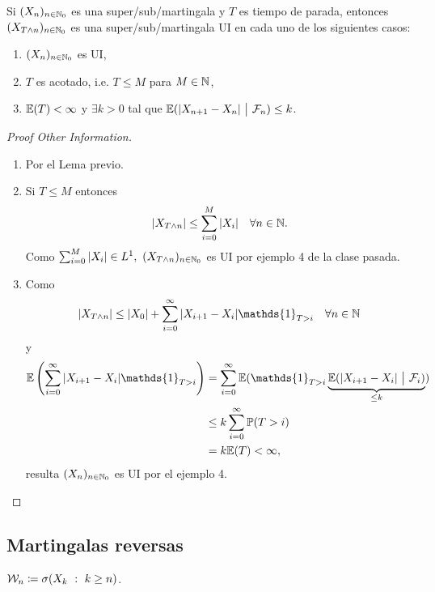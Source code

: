 \begin{theorem}
	Si $(X_{n})_{n \in \mathbb{N}_{0}}$ es una super/sub/martingala y $T$ es tiempo de parada, entonces $(X_{T \wedge n})_{n \in \mathbb{N}_{0}}$ es una super/sub/martingala UI en cada uno de los siguientes casos:
	\begin{enumerate}
		\item $(X_{n})_{n \in \mathbb{N}_{0}}$ es UI,

		\item $T$ es acotado, i.e. $T \leq M$ para $M \in \mathbb{N}$,

		\item $\mathbb{E}(T) < \infty$ y $\exists k > 0$ tal que $\mbb{E}(|X_{n+1} - X_{n}| \ \big| \ \mcal{F}_{n}) \leq k$.
	\end{enumerate}
\end{theorem}

\begin{proof}[Proof Other Information]
	\begin{enumerate}
		\item Por el Lema previo.

		\item Si $T \leq M$ entonces
		\[ |X_{T \wedge n}| \leq \sum_{i=0}^{M} |X_{i}| \quad \forall n \in \mathbb{N}. \]
		Como $\sum_{i=0}^{M} |X_{i}| \in L^{1},\ (X_{T \wedge n})_{n \in \mathbb{N}_{0}}$ es UI por ejemplo 4 de la clase pasada.

		\item Como 
		\[ |X_{T \wedge n}| \leq |X_{0}| + \sum_{i=0}^{\infty} |X_{i+1} - X_{i}| \mathds{1}_{T > i} \quad \forall n \in \N \]
		y
		\begin{align*} 
			\mbb{E}\left(\sum_{i=0}^{\infty} |X_{i+1} - X_{i}| \mathds{1}_{T > i}\right) &= \sum_{i=0}^{\infty} \mbb{E}(\mathds{1}_{T > i} \underbrace{\mbb{E}(|X_{i+1} - X_{i}| \ \big| \ \mcal{F}_{i})}_{\leq k}) \\
			&\leq k \sum_{i=0}^{\infty} \mbb{P}(T > i) \\
			&= k \mbb{E}(T) < \infty,
		\end{align*}
		resulta $(X_{n})_{n \in \mathbb{N}_{0}}$ es UI por el ejemplo 4.
	\end{enumerate}
\end{proof}

\subsection{Martingalas reversas}

$\mathcal{W}_{n} \coloneq \sigma(X_{k} \ : \ k \geq n)$.

